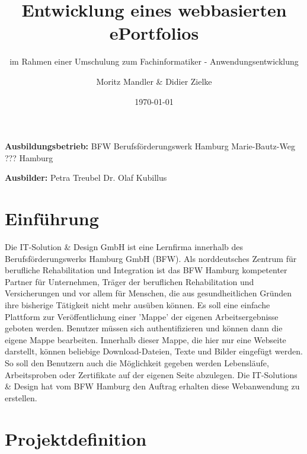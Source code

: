 \documentclass[10pt]{scrarticle}
\title{Entwicklung eines webbasierten ePortfolios}
\subtitle{im Rahmen einer Umschulung zum Fachinformatiker - Anwendungsentwicklung}
\author{Moritz Mandler \& Didier Zielke}
\date{\today}
\begin{document}
\lstset{frameround=fttt,numbers=left,breaklines=true, xleftmargin=0.75cm, basicstyle=\ttfamily, numberstyle=\ttfamily}

\maketitle


\vspace{\fill}
\textbf{Ausbildungsbetrieb:}\newline
BFW Berufsförderungswerk Hamburg \newline
Marie-Bautz-Weg ???  Hamburg

\textbf{Ausbilder:}\newline
Petra Treubel \newline
Dr. Olaf Kubillus

\newpage

\tableofcontents

\newpage

\section{Einführung}

Die IT-Solution \& Design GmbH ist eine Lernfirma innerhalb des Berufsförderungswerks Hamburg GmbH (BFW). Als norddeutsches Zentrum für berufliche Rehabilitation und Integration ist das BFW Hamburg kompetenter Partner für Unternehmen, Träger der beruflichen Rehabilitation und Versicherungen und vor allem für Menschen, die aus gesundheitlichen Gründen ihre bisherige Tätigkeit nicht mehr ausüben können.  
Es soll eine einfache Plattform zur Veröffentlichung einer 'Mappe' der eigenen Arbeitsergebnisse geboten werden. Benutzer müssen sich authentifizieren und können dann die eigene Mappe bearbeiten. Innerhalb dieser Mappe, die hier nur eine Webseite darstellt, können beliebige Download-Dateien, Texte und Bilder eingefügt werden. So soll den Benutzern auch die Möglichkeit gegeben werden Lebensläufe, Arbeitsproben oder Zertifikate auf der eigenen Seite abzulegen.
Die IT-Solutions \& Design hat vom BFW Hamburg den Auftrag erhalten diese Webanwendung zu erstellen. 

\section{Projektdefinition}
\end{document}
